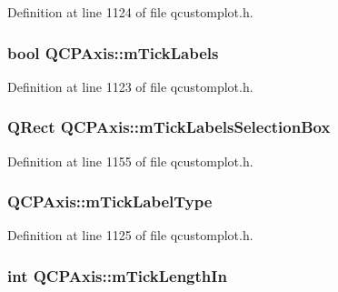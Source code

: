 Definition at line 1124 of file qcustomplot.\-h.

\hypertarget{class_q_c_p_axis_a3e4315be072026644e69009557a2fa11}{
\subsubsection[{m\-Tick\-Labels}]{\setlength{\rightskip}{0pt plus 5cm}bool Q\-C\-P\-Axis\-::m\-Tick\-Labels\hspace{0.3cm}{\ttfamily [protected]}}}\label{class_q_c_p_axis_a3e4315be072026644e69009557a2fa11}


Definition at line 1123 of file qcustomplot.\-h.

\hypertarget{class_q_c_p_axis_acca7a38191c1f4df06b9416d43172214}{
\subsubsection[{m\-Tick\-Labels\-Selection\-Box}]{\setlength{\rightskip}{0pt plus 5cm}Q\-Rect Q\-C\-P\-Axis\-::m\-Tick\-Labels\-Selection\-Box\hspace{0.3cm}{\ttfamily [protected]}}}\label{class_q_c_p_axis_acca7a38191c1f4df06b9416d43172214}


Definition at line 1155 of file qcustomplot.\-h.

\hypertarget{class_q_c_p_axis_a6e056c1cb1aab0eddebfebbcb78c8f90}{
\subsubsection[{m\-Tick\-Label\-Type}]{ Q\-C\-P\-Axis\-::m\-Tick\-Label\-Type\hspace{0.3cm}{\ttfamily [protected]}}}\label{class_q_c_p_axis_a6e056c1cb1aab0eddebfebbcb78c8f90}


Definition at line 1125 of file qcustomplot.\-h.

\hypertarget{class_q_c_p_axis_aea36f29c70d611b4486ebb3a8897c7cd}{
\subsubsection[{m\-Tick\-Length\-In}]{\setlength{\rightskip}{0pt plus 5cm}int Q\-C\-P\-Axis\-::m\-Tick\-Length\-In\hspace{0.3cm}{\ttfamily [protected]}}}\label{class_q_c_p_axis_aea36f29c70d611b4486ebb3a8897c7cd}



